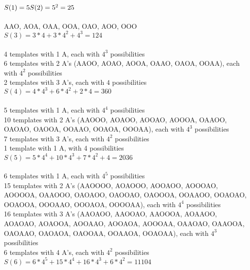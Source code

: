 \documentclass[10pt,letterpaper,unboxed,cm]{article}
\begin{document}
\begin{enumerate}
\begin{enumerate}
        $S(1) = 5 \\ \newline S(2) = 5^2 = 25$ \\\\
        AAO, AOA, OAA, OOA, OAO, AOO, OOO\\
        $S(3) = 3*4 + 3*4^2 + 4^3 = 124$\\\\
        4 templates with 1 A, each with $4^3$ possibilities\\
        6 templates with 2 A's (AAOO, AOAO, AOOA, OAAO, OAOA, OOAA), each with $4^2$ possibilities\\
        2 templates with 3 A's, each with $4$ possibilities\\
        $S(4) = 4 * 4^3 + 6 * 4^2+2*4 = 360$\\\\
        5 templates with 1 A, each with $4^4$ possibilities\\
        10 templates with 2 A's (AAOOO, AOAOO, AOOAO, AOOOA, OAAOO, OAOAO, OAOOA, OOAAO, OOAOA, OOOAA), each with $4^3$ possibilities\\
        7 templates with 3 A's, each with $4^2$ possibilities\\
        1 template with 1 A, with 4 possibilities\\
        $S(5) = 5* 4^4 + 10*4^3 + 7*4^2+4 = 2036$\\\\
        6 templates with 1 A, each with $4^5$ possibilities\\
        15 templates with 2 A's (AAOOOO, AOAOOO, AOOAOO, AOOOAO, AOOOOA, OAAOOO, OAOAOO, OAOOAO, OAOOOA, OOAAOO, OOAOAO, OOAOOA, OOOAAO, OOOAOA, OOOOAA), each with $4^4$ possibilities\\
        16 templates with 3 A's (AAOAOO, AAOOAO, AAOOOA, AOAAOO, AOAOAO, AOAOOA, AOOAAO, AOOAOA, AOOOAA, OAAOAO, OAAOOA, OAOAAO, OAOAOA, OAOOAA, OOAAOA, OOAOAA), each with $4^3$ possibilities\\
        6 templates with 4 A's, each with $4^2$ possibilities\\
        $S(6) = 6*4^5 + 15*4^4 + 16*4^3 + 6*4^2 = 11104$\\
        

\end{enumerate}
\end{enumerate}
\end{document}
